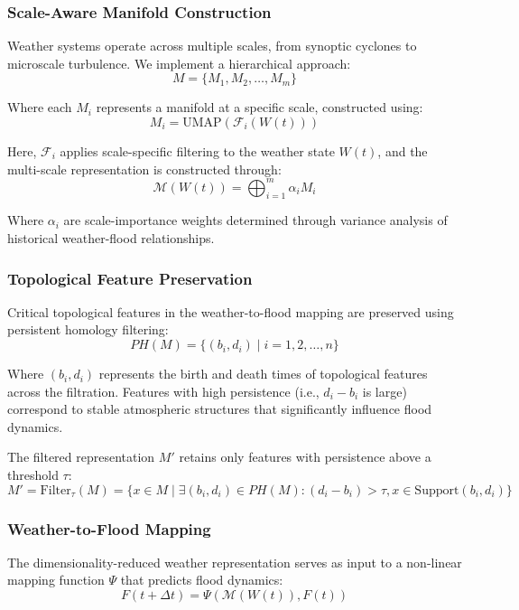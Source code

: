 \documentclass{article}
\begin{document}
\subsubsection{Scale-Aware Manifold Construction}
Weather systems operate across multiple scales, from synoptic cyclones to microscale turbulence. We implement a hierarchical approach:
\begin{equation}
M = \{M_1, M_2, \ldots, M_m\}
\end{equation}

Where each $M_i$ represents a manifold at a specific scale, constructed using:
\begin{equation}
M_i = \text{UMAP}(\mathcal{F}_i(W(t)))
\end{equation}

Here, $\mathcal{F}_i$ applies scale-specific filtering to the weather state $W(t)$, and the multi-scale representation is constructed through:
\begin{equation}
\mathcal{M}(W(t)) = \bigoplus_{i=1}^{m} \alpha_i M_i
\end{equation}

Where $\alpha_i$ are scale-importance weights determined through variance analysis of historical weather-flood relationships.

\subsubsection{Topological Feature Preservation}
Critical topological features in the weather-to-flood mapping are preserved using persistent homology filtering:
\begin{equation}
PH(M) = \{(b_i, d_i) \mid i = 1, 2, \ldots, n\}
\end{equation}

Where $(b_i, d_i)$ represents the birth and death times of topological features across the filtration. Features with high persistence (i.e., $d_i - b_i$ is large) correspond to stable atmospheric structures that significantly influence flood dynamics.

The filtered representation $M'$ retains only features with persistence above a threshold $\tau$:
\begin{equation}
M' = \text{Filter}_\tau(M) = \{x \in M \mid \exists (b_i, d_i) \in PH(M) : (d_i - b_i) > \tau, x \in \text{Support}(b_i, d_i)\}
\end{equation}

\subsubsection{Weather-to-Flood Mapping}
The dimensionality-reduced weather representation serves as input to a non-linear mapping function $\Psi$ that predicts flood dynamics:
\begin{equation}
F(t+\Delta t) = \Psi(\mathcal{M}(W(t)), F(t))
\end{equation}
\end{document}
